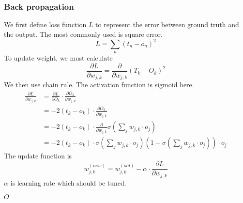 \documentclass[catalog.tex]{subfiles}
\begin{document}
\subsubsection{Back propagation}
We first define loss function $L$ to represent the error between ground truth and the output. The most commonly used is square error. 
\begin{equation}
L = \sum_n(t_n - o_n)^2
\end{equation}
To update weight, we must calculate
\begin{equation}
\frac{\partial L}{\partial w_{j,k}} = \frac{\partial}{\partial w_{j,k}}(T_k - O_k)^2
\end{equation}
We then use chain rule. The activation function is sigmoid here.
\begin{align*}
\frac{\partial L}{\partial w_{j,k}} 
&= \frac{\partial L}{\partial O_k}\cdot \frac{\partial O_k}{\partial w_{j,k}}\\
&=-2(t_k - o_k)\cdot \frac{\partial O_k}{\partial w_{j,k}}\\
& = -2(t_k - o_k)\cdot \frac{\partial}{\partial w_{j,k}} \sigma(\sum_j w_{j,k} \cdot o_j)\\
&=-2(t_k - o_k)\cdot \sigma(\sum_j w_{j,k} \cdot o_j)(1-\sigma(\sum_j w_{j,k} \cdot o_j))\cdot o_j
\end{align*}
The update function is
\begin{equation}
w^{(new)}_{j,k} = w^{(old)}_{j,k} - \alpha \cdot \frac{\partial L}{\partial w_{j,k}}
\end{equation}
$\alpha$ is learning rate which should be tuned.




\begin{Algorithm}[Neural network\label{alg:\currfilebase}]
	\BlankLine

	\Ret $O$

\end{Algorithm}
\end{document}
